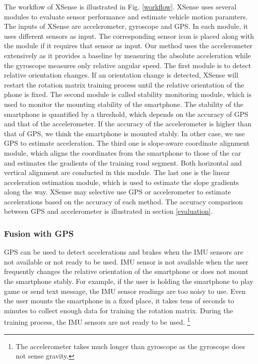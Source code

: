 The workflow of XSense is illustrated in Fig. \ref{workflow}. 
XSense uses several modules to evaluate sensor
performance and estimate vehicle motion paramters. 
The inputs of XSense are accelerometer, gyroscope
and GPS.  
In each module, it uses different sensors as input.  
The corresponding sensor icon is placed along with the 
module if it requires that sensor as input.  
Our method uses the accelerometer extensively
as it provides a baseline by measuring the absolute acceleration while
the gyroscope measures only relative angular speed. 
The first module is to detect relative orientation changes.  
If an orientation change is detected, 
XSense will restart the rotation matrix
training process until the 
relative orientation of the phone is fixed.  
The second module is called stability monitoring
module, which is used to monitor the mounting
stability of the smartphone. 
The stability of the smartphone is quantified
by a threshold, which depends on the 
accuracy of GPS and that of the accelerometer. 
If the accuracy of the accelerometer is higher
than that of GPS, we think the smartphone
is mounted stably. 
In other case, we use GPS to estimate acceleration.
The third one is slope-aware coordinate
alignment module, 
which aligns the coordinates from the smartphone
to those of the car and estimates
the gradients of the training road segment. 
Both horizontal and vertical alignment are conducted
in this module. 
The last one is the linear acceleration estimation
module, which is used to estimate the slope 
gradients along the way.
XSense may selective use GPS or accelerometer
to estimate accelerations based on
the accuracy of each method. 
The accuracy comparison between GPS and accelerometer
is illustrated in section \ref{evaluation}. 



\subsubsection{Fusion with GPS}


GPS can be used to detect accelerations and brakes
when the IMU sensors are not available or not
ready to be used. 
IMU sensor is not available when the user 
frequently changes the relative orientation of the smartphone
or does not mount the smartphone stably. 
For example, if the user is holding the smartphone
to play game or send text message, 
the IMU sensor readings are too noisy 
to use. 
Even the user mounts the smartphone in a 
fixed place, it takes tens of seconds to minutes 
to collect enough data for training the rotation matrix. 
During the training process, the 
IMU sensors are not ready to be used.  
\footnote{The accelerometer takes much longer than gyroscope
as the gyroscope does not sense gravity.}


